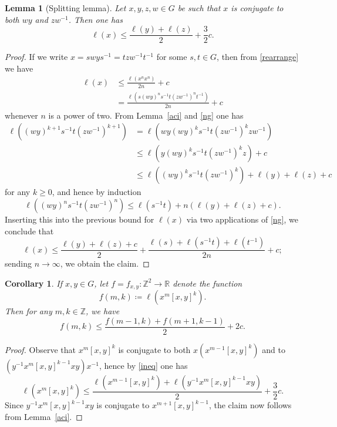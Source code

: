 \documentclass[11pt,a4paper,reqno]{amsart}
\numberwithin{equation}{section}
\theoremstyle{plain}
\newtheorem{lemma}[equation]{Lemma}
\newtheorem{corollary}[equation]{Corollary}
\theoremstyle{definition}
\newcommand\R{\mathbb{R}}
\newcommand\Z{\mathbb{Z}}
\newcommand\norm[1]{\ell({#1})}   %
\begin{document}
\begin{lemma}[Splitting lemma]\label{split}
Let $x,y,z,w \in G$ be such that $x$ is conjugate to both $wy$ and
$zw^{-1}$.  Then one has
\begin{equation}\label{ineq}
\norm{x} \leq \frac{\norm{y} + \norm{ z } }{2}  + \frac{3}{2}
{ c}.
\end{equation}
\end{lemma}

\begin{proof}
If we write $x = swys^{-1} = t zw^{-1} t^{-1}$ for some $s,t \in G$, then
from \eqref{rearrange} we have
\begin{align*}
 \norm{x} &\leq \frac{\norm{ x^n x^n } }{2n} + { c} \\
&= \frac{\norm{ s(wy)^n s^{-1}t (zw^{-1})^n t^{-1} } }{2n} +
{ c}
\end{align*}
whenever $n$ is a power of two.  From Lemma~\ref{aci} and \eqref{ng} one
has
\begin{align*}
\norm{(wy)^{k+1} s^{-1}t (zw^{-1})^{k+1} } &= \norm{ w y (wy)^k s^{-1} t
(zw^{-1})^k z w^{-1} } \\
&\leq \norm{ y (wy)^k s^{-1} t (zw^{-1})^k z } + { c} \\
&\leq \norm{ (wy)^k s^{-1} t (zw^{-1})^k } + \norm{y} + \norm{z} +
{ c}
\end{align*}
for any $k \geq 0$, and hence by induction
\[
\norm{(wy)^n s^{-1}t (zw^{-1})^n } \leq \norm{s^{-1} t} + n ( \norm{y} +
\norm{z} + { c} ).
\]
Inserting this into the previous bound for $\norm{x}$ via two
applications of \eqref{ng}, we conclude that
\[
\norm{x} \leq \frac{\norm{y} + \norm{z}+ { c} }{2} +
\frac{\norm{s} + \norm{s^{-1}t} + \norm{t^{-1}} }{2n} + { c};
\]
sending $n \to \infty$, we obtain the claim.
\end{proof}


\begin{corollary}
If $x,y \in G$, let $f = f_{x,y}: \Z^2 \to \R$ denote the function
\[
f(m,k) \coloneqq \norm{ x^m [x,y]^k }.
\]
Then for any $m,k \in \Z$, we have
\begin{equation}\label{fmk}
 f(m,k) \leq \frac{f(m-1,k) + f(m+1,k-1)}{2} + { 2c}.
\end{equation}
\end{corollary}

\begin{proof}
Observe that $x^m [x,y]^k$ is conjugate to both $x (x^{m-1} [x,y]^k)$ and
to $(y^{-1} x^m [x,y]^{k-1} xy) x^{-1}$, hence by \eqref{ineq} one has
\[
\norm{ x^m [x,y]^k } \leq \frac{\norm{ x^{m-1} [x,y]^k } + \norm{ y^{-1}
x^{m} [x,y]^{k-1} xy }}{2} + { \frac{3}{2} c}.
\]
Since $y^{-1} x^{m} [x,y]^{k-1} xy $ is conjugate to $x^{m+1}
[x,y]^{k-1}$, the claim now follows from Lemma~\ref{aci}.
\end{proof}
\end{document}
